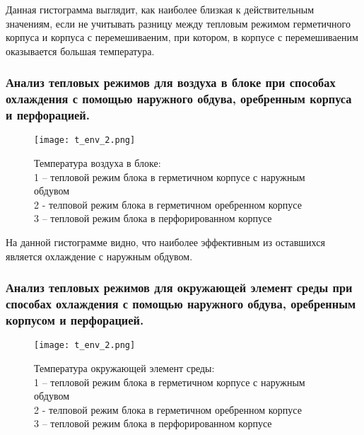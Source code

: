 Данная гистограмма выглядит,
как наиболее близкая к действительным значениям,
если не учитывать разницу между тепловым режимом герметичного корпуса
и корпуса с перемешиваеним, при котором, в корпусе с перемешиваеним
оказывается большая температура.

\subsubsection{Анализ тепловых режимов  для
воздуха в блоке при способах охлаждения с помощью наружного обдува,
оребренным корпуса и перфорацией.}

\begin{figure}[h] %
\begin{center}
  \texttt{[image: t\_env\_2.png]}
  \end{center}
\caption{Температура воздуха в блоке:\\
  1 – тепловой режим блока в герметичном корпусе с наружным обдувом\\
  2 - телповой режим блока в  герметичном оребренном корпусе \\
  3 – тепловой режим блока в перфорированном корпусе \\
}

\end{figure}

На данной гистограмме видно, что наиболее эффективным из оставшихся
является охлаждение с наружным обдувом.

\subsubsection{Анализ тепловых режимов для окружающей элемент среды при
способах охлаждения с помощью наружного обдува, оребренным корпусом и
перфорацией.}

\begin{figure}[h] %
\begin{center}
  \texttt{[image: t\_env\_2.png]}
\end{center}
\caption{Температура окружающей элемент среды:\\
  1 – тепловой режим блока в герметичном корпусе с наружным обдувом\\
  2 - телповой режим блока в  герметичном оребренном корпусе \\
  3 – тепловой режим блока в перфорированном корпусе \\
}

\end{figure}

